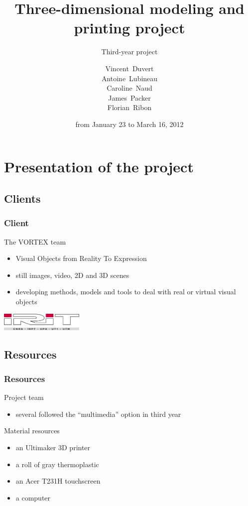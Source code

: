 \documentclass{beamer}
\title{Three-dimensional modeling and printing project}
\subtitle{Third-year project}
\author[V. Duvert, A. Lubineau, C. Naud, J. Packer, F. Ribon]{\scriptsize
Vincent~Duvert \\ Antoine~Lubineau \\ Caroline~Naud \\ James~Packer \\ Florian~Ribon}
\date{from January 23 to March 16, 2012}
\begin{document}
\frame{\titlepage}

\section{Presentation of the project}

\subsection{Clients}
\begin{frame}
	\frametitle{Client}
	
	\begin{block}{The \textsc{VORTEX} team}
		\begin{itemize}
			\item Visual Objects from Reality To Expression
			\item still images, video, 2D and 3D scenes
			\item developing methods, models and tools to deal with real or virtual visual objects
		\end{itemize}
    \end{block}
    
    \begin{center}
		\includegraphics[width=4cm]{irit}
	\end{center}
    
\end{frame}

\subsection{Resources}
\begin{frame}
	\frametitle{Resources}
	
	\begin{block}{Project team}
		\begin{itemize}
			\item several followed the “multimedia” option in third year
		\end{itemize}
    \end{block}
    
    \begin{block}{Material resources}
		\begin{itemize}
			\item an Ultimaker 3D printer
			\item a roll of gray thermoplastic
			\item an Acer T231H touchscreen
			\item a computer
		\end{itemize}
    \end{block}
      
\end{frame}
\end{document}
